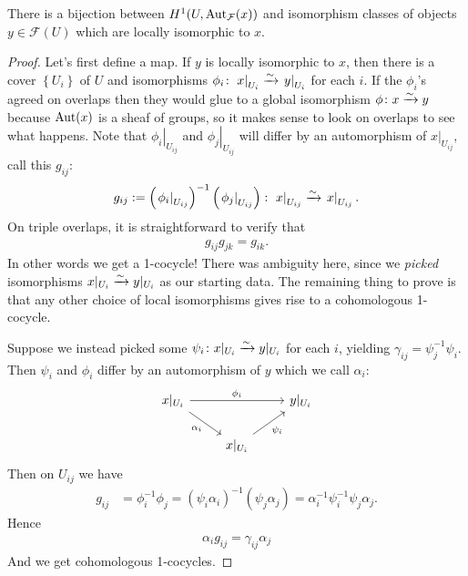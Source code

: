 \documentclass[11pt,openany]{book}
\begin{document}
\begin{theorem} There is a bijection between $H^1(U,\mathrm{Aut}_{\mathcal{F}}(x))$ and isomorphism classes of objects $y\in \mathscr{F}(U)$ which are locally isomorphic to $x$.
\end{theorem}
\begin{proof} Let's first define a map. If $y$ is locally isomorphic to $x$, then there is a cover $\left\{ U_i \right\}$ of $U$ and isomorphisms $\phi_i \colon \left. x \right|_{ U_i } \xrightarrow{\sim} \left. y \right|_{ U_i }$ for each $i$. If the $\phi_i$'s agreed on overlaps then they would glue to a global isomorphism $\phi \colon x \xrightarrow{\sim} y$ because $\mathrm{Aut}(x)$ is a sheaf of groups, so it makes sense to look on overlaps to see what happens. Note that $\left. \phi_i \right|_{ U_{ij} }$ and $\left. \phi_j \right|_{ U_{ij} }$ will differ by an automorphism of $\left. x \right|_{ U_{ij} }$, call this $g_{ij}$:
\begin{align*}
    g_{ij} := \left( \left. \phi_i \right|_{ U_{ij} } \right)^{-1} \left( \left. \phi_j \right|_{ U_{ij} } \right) \colon \left. x \right|_{ U_{ij}  }\xrightarrow{\sim} \left. x \right|_{ U_{ij} }.
\end{align*}
On triple overlaps, it is straightforward to verify that
\begin{align*}
    g_{ij}g_{jk} = g_{ik}.
\end{align*}
In other words we get a 1-cocycle! There was ambiguity here, since we \textit{picked} isomorphisms $x|_{U_i} \xrightarrow{\sim} y|_{U_i}$ as our starting data. The remaining thing to prove is that any other choice of local isomorphisms gives rise to a cohomologous 1-cocycle.

Suppose we instead picked some $\psi_i \colon x|_{U_i} \xrightarrow{\sim} y|_{U_i}$ for each $i$, yielding $\gamma_{ij} = \psi_j^{-1}\psi_i $. Then $\psi_i$ and $\phi_i$ differ by an automorphism of $y$ which we call $\alpha_i$:
\[ \begin{tikzcd}
    x|_{U_i}\ar[rr,"\phi_i"]\ar[dr,"\alpha_i" below left] &  & y|_{U_i}\\
     & x|_{U_i}\ar[ur,"\psi_i" below right] & 
\end{tikzcd} \]
%
Then on $U_{ij}$ we have
\begin{align*}
    g_{ij} &= \phi_i^{-1} \phi_j = \left( \psi_i \alpha_i \right)^{-1} \left( \psi_j \alpha_j \right) = \alpha_i^{-1} \psi_i^{-1}\psi_j \alpha_j.
\end{align*}
Hence
\begin{align*}
    \alpha_i g_{ij} = \gamma_{ij}\alpha_j
\end{align*}
And we get cohomologous 1-cocycles.
\end{proof}
\end{document}
